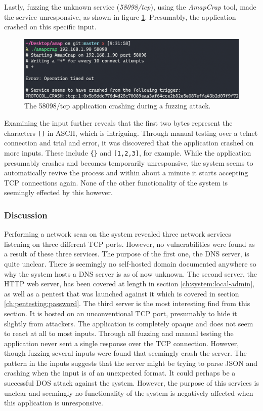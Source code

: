 Lastly, fuzzing the unknown service (\textit{58098/tcp}), using the \textit{AmapCrap} tool, made the service unresponsive, as shown in figure \ref{fig:amapcrap-fuzz-attack}. Presumably, the application crashed on this specific input.
\begin{figure}[!ht]
    \centering
    \includegraphics[width=\textwidth]{images/6-pentesting/amapcrap-fuzz-crash.png}
    \caption{The 58098/tcp application crashing during a fuzzing attack.}
    \label{fig:amapcrap-fuzz-attack}
\end{figure}

Examining the input further reveals that the first two bytes represent the characters \texttt{[]} in ASCII, which is intriguing. Through manual testing over a telnet connection and trial and error, it was discovered that the application crashed on more inputs. These include \texttt{\{\}} and \texttt{[1,2,3]}, for example. While the application presumably crashes and becomes temporarily unresponsive, the system seems to automatically revive the process and within about a minute it starts accepting TCP connections again. None of the other functionality of the system is seemingly effected by this however.

\subsubsection{Discussion}
Performing a network scan on the system revealed three network services listening on three different TCP ports. However, no vulnerabilities were found as a result of these three services. The purpose of the first one, the DNS server, is quite unclear. There is seemingly no self-hosted domain documented anywhere so why the system hosts a DNS server is as of now unknown. The second server, the HTTP web server, has been covered at length in section \ref{ch:system:local-admin}, as well as a pentest that was launched against it which is covered in section \ref{ch:pentesting:password}. The third server is the most interesting find from this section. It is hosted on an unconventional TCP port, presumably to hide it slightly from attackers. The application is completely opaque and does not seem to react at all to most inputs. Through all fuzzing and manual testing the application never sent a single response over the TCP connection. However, though fuzzing several inputs were found that seemingly crash the server. The pattern in the inputs suggests that the server might be trying to parse JSON and crashing when the input is of an unexpected format. It could perhaps be a successful \gls{DOS} attack against the system. However, the purpose of this services is unclear and seemingly no functionality of the system is negatively affected when this application is unresponsive.

